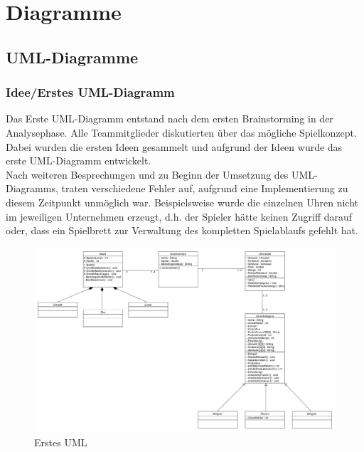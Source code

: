 \clearpage
\chapter{Diagramme}
\section{UML-Diagramme}
\subsection{Idee/Erstes UML-Diagramm}
Das Erste UML-Diagramm entstand nach dem ersten Brainstorming in der Analysephase. Alle Teammitglieder diskutierten über das mögliche Spielkonzept. Dabei wurden die ersten Ideen gesammelt und aufgrund der Ideen wurde das erste UML-Diagramm entwickelt. \\
Nach weiteren Besprechungen und zu Beginn der Umsetzung des UML-Diagramms, traten verschiedene Fehler auf, aufgrund eine Implementierung zu diesem Zeitpunkt unmöglich war. 
Beispielsweise wurde die einzelnen Uhren nicht im jeweiligen Unternehmen erzeugt, d.h. der Spieler hätte keinen Zugriff darauf oder, dass ein Spielbrett zur Verwaltung des kompletten Spielablaufs gefehlt hat.

\begin{figure} [h]
	\centering
	\includegraphics[scale=0.35, angle=90]{img/ErsterEntwurfUML.png} 
	\caption{Erstes UML} \label{fig:abb26}
\end{figure}

\clearpage
